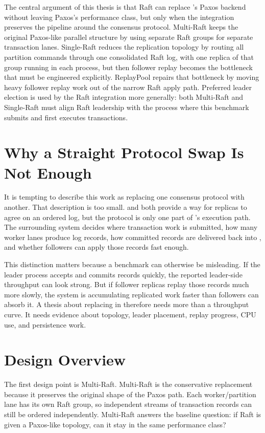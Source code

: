 The central argument of this thesis is that Raft can replace \Mako{}'s Paxos
backend without leaving Paxos's performance class, but only when the
integration preserves the pipeline around the consensus protocol. Multi-Raft
keeps the original Paxos-like parallel structure by using separate Raft groups
for separate transaction lanes. Single-Raft reduces the replication topology by
routing all partition commands through one consolidated Raft log, with one
replica of that group running in each process, but then follower replay becomes
the bottleneck that must be engineered explicitly. ReplayPool repairs that
bottleneck by moving heavy follower replay work out of the narrow Raft apply
path. Preferred leader election is used by the Raft integration more
generally: both Multi-Raft and Single-Raft must align Raft leadership with the
process where this \Mako{} benchmark submits and first executes transactions.

\section{Why a Straight Protocol Swap Is Not Enough}

It is tempting to describe this work as replacing one consensus protocol with
another. That description is too small. \Paxos{} and \Raft{} both provide a
way for replicas to agree on an ordered log, but the protocol is only one part
of \Mako{}'s execution path. The surrounding system decides where transaction
work is submitted, how many worker lanes produce log records, how committed
records are delivered back into \Mako{}, and whether followers can apply those
records fast enough.

This distinction matters because a benchmark can otherwise be misleading. If
the leader process accepts and commits records quickly, the reported
leader-side throughput can look strong. But if follower replicas replay those
records much more slowly, the system is accumulating replicated work faster
than followers can absorb it. A thesis about replacing \Paxos{} in \Mako{}
therefore needs more than a throughput curve. It needs evidence about topology,
leader placement, replay progress, CPU use, and persistence work.

\section{Design Overview}

The first design point is Multi-Raft. Multi-Raft is the conservative
replacement because it preserves the original shape of the Paxos path. Each
worker/partition lane has its own Raft group, so independent streams of
transaction records can still be ordered independently. Multi-Raft answers the
baseline question: if Raft is given a Paxos-like topology, can it stay in the
same performance class?

